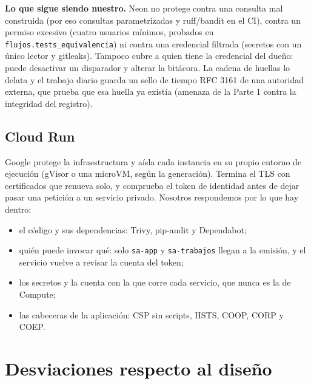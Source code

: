 \documentclass[11pt,letterpaper]{article}
\newcommand{\cod}[1]{\texttt{\small #1}}
\begin{document}
\textbf{Lo que sigue siendo nuestro.} Neon no protege contra una consulta mal construida (por eso
consultas parametrizadas y ruff/bandit en el CI), contra un permiso excesivo (cuatro usuarios
mínimos, probados en \cod{flujos.tests\_equivalencia}) ni contra una credencial filtrada (secretos con
un único lector y gitleaks). Tampoco cubre a quien tiene la credencial del dueño: puede desactivar un
disparador y alterar la bitácora. La cadena de huellas lo delata y el trabajo diario guarda un sello
de tiempo RFC 3161 de una autoridad externa, que prueba que esa huella ya existía (amenaza de la
Parte 1 contra la integridad del registro).

\subsection{Cloud Run}

Google protege la infraestructura y aísla cada instancia en su propio entorno de ejecución (gVisor o
una microVM, según la generación). Termina el TLS con certificados
que renueva solo, y comprueba el token de identidad antes de dejar pasar una petición a un servicio
privado. Nosotros respondemos por lo que hay dentro:
\begin{itemize}
  \item el código y sus dependencias: Trivy, pip-audit y Dependabot;
  \item quién puede invocar qué: solo \cod{sa-app} y \cod{sa-trabajos} llegan a la emisión, y el
    servicio vuelve a revisar la cuenta del token;
  \item los secretos y la cuenta con la que corre cada servicio, que nunca es la de Compute;
  \item las cabeceras de la aplicación: CSP sin scripts, HSTS, COOP, CORP y COEP.
\end{itemize}

\section{Desviaciones respecto al diseño}
\end{document}
